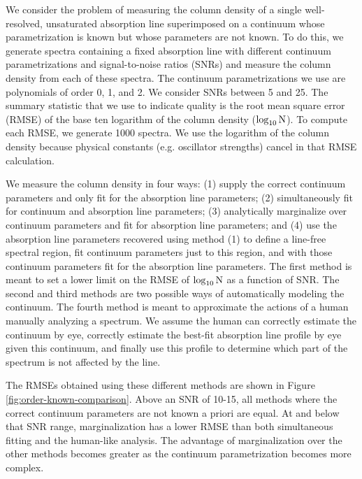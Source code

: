 \documentclass[manuscript]{aastex62}
\begin{document}
We consider the problem of measuring the column density of a single well-resolved, unsaturated absorption line superimposed on a continuum whose parametrization is known but whose parameters are not known.
To do this, we generate spectra containing a fixed absorption line with different continuum parametrizations and signal-to-noise ratios (SNRs) and measure the column density from each of these spectra.
The continuum parametrizations we use are polynomials of order 0, 1, and 2.
We consider SNRs between 5 and 25.
The summary statistic that we use to indicate quality is the root mean square error (RMSE) of the base ten logarithm of the column density ($\log_{10}{\rm N}$).
To compute each RMSE, we generate 1000 spectra.
We use the logarithm of the column density because physical constants (e.g. oscillator strengths) cancel in that RMSE calculation.

We measure the column density in four ways: (1) supply the correct continuum parameters and only fit for the absorption line parameters; (2) simultaneously fit for continuum and absorption line parameters; (3) analytically marginalize over continuum parameters and fit for absorption line parameters; and (4) use the absorption line parameters recovered using method (1) to define a line-free spectral region, fit continuum parameters just to this region, and with those continuum parameters fit for the absorption line parameters.
The first method is meant to set a lower limit on the RMSE of $\log_{10}{\rm N}$ as a function of SNR.
The second and third methods are two possible ways of automatically modeling the continuum.
The fourth method is meant to approximate the actions of a human manually analyzing a spectrum.
We assume the human can correctly estimate the continuum by eye, correctly estimate the best-fit absorption line profile by eye given this continuum, and finally use this profile to determine which part of the spectrum is not affected by the line.

The RMSEs obtained using these different methods are shown in Figure \ref{fig:order-known-comparison}.
Above an SNR of 10-15, all methods where the correct continuum parameters are not known a priori are equal.
At and below that SNR range, marginalization has a lower RMSE than both simultaneous fitting and the human-like analysis.
The advantage of marginalization over the other methods becomes greater as the continuum parametrization becomes more complex.
\end{document}
